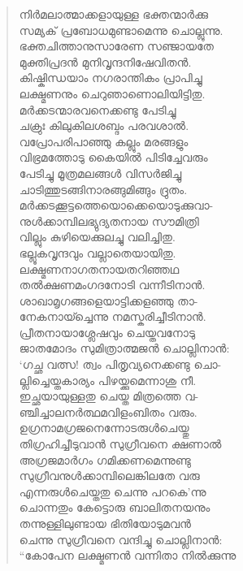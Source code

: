 \begin{verse}
നിര്‍മലാത്മാക്കളായുള്ള ഭക്തന്മാര്‍ക്കു\\
സമ്യക് പ്രബോധമുണ്ടാമെന്നു ചൊല്ലുന്നു.\\
ഭക്തചിത്താനുസാരേണ സഞ്ജായതേ\\
മുക്തിപ്രദന്‍ മുനിവൃന്ദനിഷേവിതന്‍.\\
കിഷ്കിന്ധയാം നഗരാന്തികം പ്രാപിച്ചു\\
ലക്ഷ്മണനും ചെറുഞാണൊലിയിട്ടിതു.\\
മര്‍ക്കടന്മാരവനെക്കണ്ടു പേടിച്ചു\\
ചക്രുഃ കിലുകിലശബ്ദം പരവശാല്‍.\\
വപ്രോപരിപാഞ്ഞു കല്ലും മരങ്ങളും\\
വിഭ്രമത്തോടു കൈയില്‍ പിടിച്ചേവരും\\
പേടിച്ചു മൂത്രമലങ്ങള്‍ വിസര്‍ജിച്ചു\\
ചാടിത്തുടങ്ങിനാരങ്ങുമിങ്ങും ദ്രുതം.\\
മര്‍ക്കടക്കൂട്ടത്തെയൊക്കെയൊടുക്കുവാ-\\
നുള്‍ക്കാമ്പിലഭ്യുദ്യതനായ സൗമിത്രി\\
വില്ലും കുഴിയെക്കുലച്ചു വലിച്ചിതു.\\
ഭല്ലൂകവൃന്ദവും വല്ലാതെയായിതു.\\
ലക്ഷ്മണനാഗതനായതറിഞ്ഞഥ\\
തല്‍ക്ഷണമംഗദനോടി വന്നീടിനാന്‍.\\
ശാഖാമൃഗങ്ങളെയാട്ടിക്കളഞ്ഞു താ-\\
നേകനായ്ച്ചെന്നു നമസ്കരിച്ചീടിനാന്‍.\\
പ്രീതനായാശ്ലേഷവും ചെയ്തവനോടു\\
ജാതമോദം സുമിത്രാത്മജന്‍ ചൊല്ലിനാന്‍:\\
‘ഗച്ഛ വത്സ! ത്വം പിതൃവ്യനെക്കണ്ടു ചൊ-\\
ല്ലിച്ചെയ്തകാര്യം പിഴയ്ക്കുമെന്നാശു നീ.\\
ഇച്ഛയായുള്ളതു ചെയ്ത മിത്രത്തെ വ-\\
ഞ്ചിച്ചാലനര്‍ത്ഥമവിളംബിതം വരും.\\
ഉഗ്രനാമഗ്രജനെന്നോടരുള്‍ചെയ്തു\\
തിഗ്രഹിച്ചീടുവാന്‍ സുഗ്രീവനെ ക്ഷണാല്‍\\
അഗ്രജമാര്‍ഗം ഗമിക്കണമെന്നുണ്ടു\\
സുഗ്രീവനുള്‍ക്കാമ്പിലെങ്കിലതേ വരു\\
എന്നരുള്‍ചെയ്തതു ചെന്നു പറകെ’ന്നു\\
ചൊന്നതും കേട്ടൊരു ബാലിതനയനും\\
തന്നുള്ളിലുണ്ടായ ഭിതിയോടുമവന്‍\\
ചെന്നു സുഗ്രീവനെ വന്ദിച്ചു ചൊല്ലിനാന്‍:\\
“കോപേന ലക്ഷ്മണന്‍ വന്നിതാ നില്‍ക്കുന്നു\\

\end{verse}
